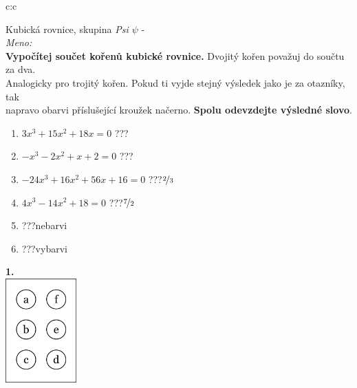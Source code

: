 \documentclass[10pt]{report}
\begin{document}
\begin{tabular}{c:c}
\begin{minipage}[c][99mm][t]{0.49\linewidth}
\begin{center}
\vspace{7mm}
{\huge Kubická rovnice, skupina \textit{Psi $\psi$} -}\\[4.5mm]
\textit{Meno:}\phantom{xxxxxxxxxxxxxxxxxxxxxxxxxxxxxxxxxxxxxxxxxxxxxxxxxxxxxxxxxxxxxxxxx}\\[3.5mm]
\textbf{Vypočítej součet kořenů kubické rovnice.} Dvojitý kořen považuj do součtu za dva.\\Analogicky pro trojitý kořen. Pokud ti vyjde stejný výsledek jako je za otazníky, tak\\napravo obarvi příslušející kroužek načerno. \textbf{Spolu odevzdejte výsledné slovo}.\\[3mm]
\begin{minipage}{0.77\linewidth}
\begin{center}
\begin{varwidth}{\textwidth}
\begin{enumerate}
\large
\item $3x^3+15x^2+18x=0$\quad \dotfill\; ???\;\dotfill {}
\item $-x^3-2x^2+x+2=0$\quad \dotfill\; ???\;\dotfill {}
\item $-24x^3+16x^2+56x+16=0$\quad \dotfill\; ???\;\dotfill \quad $\nicefrac{2}{3}$
\item $4x^3-14x^2+18=0$\quad \dotfill\; ???\;\dotfill \quad $\nicefrac{7}{2}$
\item \quad \dotfill\; ???\;\dotfill \quad nebarvi
\item \quad \dotfill\; ???\;\dotfill \quad vybarvi
\end{enumerate}
\end{varwidth}
\end{center}
\end{minipage}
\begin{minipage}{0.20\linewidth}
\begin{center}
{\Huge\bfseries 1.} \\[2mm]
\includegraphics[height=40mm]{../images/braille.png}

\end{center}
\end{minipage}
\end{center}
\end{minipage}
\end{tabular}
\end{document}

